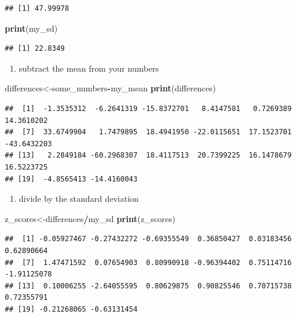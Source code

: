 \documentclass[]{book}
\newenvironment{Shaded}{\begin{snugshade}}{\end{snugshade}}
\newcommand{\KeywordTok}[1]{\textcolor[rgb]{0.13,0.29,0.53}{\textbf{#1}}}
\newcommand{\OperatorTok}[1]{\textcolor[rgb]{0.81,0.36,0.00}{\textbf{#1}}}
\newcommand{\NormalTok}[1]{#1}
\providecommand{\tightlist}{%
  \setlength{\itemsep}{0pt}\setlength{\parskip}{0pt}}
\begin{document}
\begin{verbatim}
## [1] 47.99978
\end{verbatim}

\begin{Shaded}
\begin{Highlighting}[]
\KeywordTok{print}\NormalTok{(my_sd)}
\end{Highlighting}
\end{Shaded}

\begin{verbatim}
## [1] 22.8349
\end{verbatim}

\begin{enumerate}
\def\labelenumi{\arabic{enumi}.}
\setcounter{enumi}{2}
\tightlist
\item
  subtract the mean from your numbers
\end{enumerate}

\begin{Shaded}
\begin{Highlighting}[]
\NormalTok{differences<-some_numbers}\OperatorTok{-}\NormalTok{my_mean}
\KeywordTok{print}\NormalTok{(differences)}
\end{Highlighting}
\end{Shaded}

\begin{verbatim}
##  [1]  -1.3535312  -6.2641319 -15.8372701   8.4147581   0.7269389  14.3610202
##  [7]  33.6749904   1.7479895  18.4941950 -22.0115651  17.1523701 -43.6432203
## [13]   2.2849184 -60.2968307  18.4117513  20.7399225  16.1478679  16.5223725
## [19]  -4.8565413 -14.4160043
\end{verbatim}

\begin{enumerate}
\def\labelenumi{\arabic{enumi}.}
\setcounter{enumi}{3}
\tightlist
\item
  divide by the standard deviation
\end{enumerate}

\begin{Shaded}
\begin{Highlighting}[]
\NormalTok{z_scores<-differences}\OperatorTok{/}\NormalTok{my_sd}
\KeywordTok{print}\NormalTok{(z_scores)}
\end{Highlighting}
\end{Shaded}

\begin{verbatim}
##  [1] -0.05927467 -0.27432272 -0.69355549  0.36850427  0.03183456  0.62890664
##  [7]  1.47471592  0.07654903  0.80990918 -0.96394402  0.75114716 -1.91125078
## [13]  0.10006255 -2.64055595  0.80629875  0.90825546  0.70715738  0.72355791
## [19] -0.21268065 -0.63131454
\end{verbatim}
\end{document}
